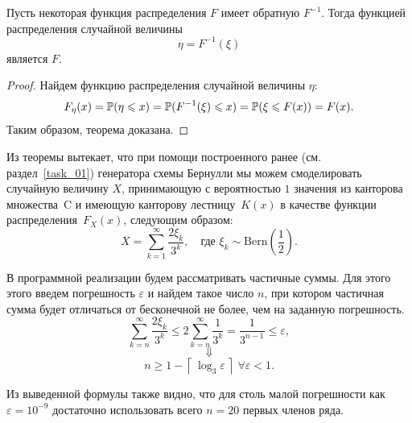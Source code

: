 \begin{theorem}
        Пусть некоторая функция распределения $F$ имеет обратную $F^{-1}$. Тогда функцией распределения случайной величины
        $$
                \eta = F^{-1}(\xi)
        $$
        является $F$.
\end{theorem}
\begin{proof}
        Найдем функцию распределения случайной величины $\eta$:
        $$
                F_\eta(x) =
                \mathbb{P}(\eta \leqslant x) =
                \mathbb{P}(F^{-1}(\xi) \leqslant x) =
                \mathbb{P}(\xi \leqslant F(x)) =
                F(x).
        $$
        Таким образом, теорема доказана.

\end{proof}

Из теоремы вытекает, что при помощи построенного ранее (см. раздел~\ref{task_01}) генератора схемы Бернулли мы можем смоделировать случайную величину $X$, принимающую с вероятностью $1$ значения из канторова множества~C и имеющую канторову лестницу~$K(x)$ в качестве функции распределения~$F_X(x)$, следующим образом:
$$
        X = \sum_{k = 1}^{\infty}\frac{2\xi_k}{3^k},
        \quad
        \mbox{где $\xi_k\sim\mbox{Bern}\left(\frac12\right)$.}
$$

В программной реализации будем рассматривать частичные суммы. Для этого этого введем погрешность $\varepsilon$ и найдем такое число $n$, при котором частичная сумма будет отличаться от бесконечной не более, чем на заданную погрешность.
$$
        \sum_{k=n}^{\infty} \frac{2\xi_k}{3^k} \leqslant 2\sum_{k=n}^{\infty}\frac{1}{3^k} = \frac{1}{3^{n-1}} \leqslant \varepsilon,
$$
$$
        \Downarrow
$$
$$
        n \geqslant 1 - \left\lceil\,\log_3 \varepsilon\,\right\rceil \; \forall \varepsilon < 1.
$$
\begin{remark}
        Из выведенной формулы также видно, что для столь малой погрешности как $\varepsilon = 10^{-9}$ достаточно использовать всего $n = 20$ первых членов ряда.
\end{remark}

